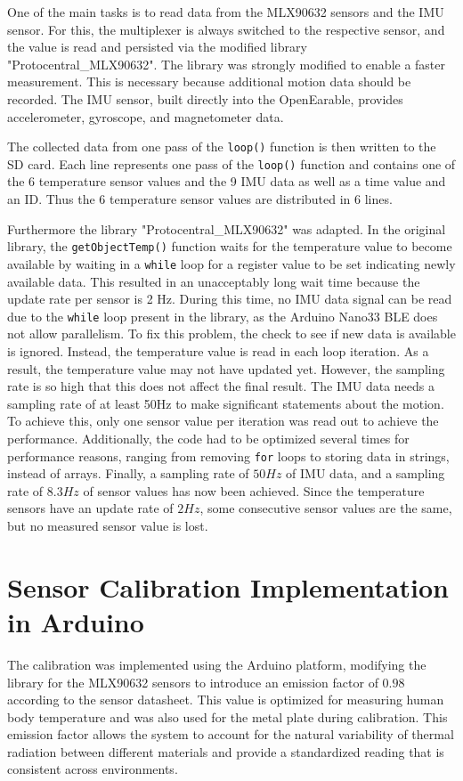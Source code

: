 One of the main tasks is to read data from the MLX90632 sensors and the IMU sensor. 
For this, the multiplexer is always switched to the respective sensor, and the value is read and persisted via the modified library "Protocentral\_MLX90632".
The library was strongly modified to enable a faster measurement. 
This is necessary because additional motion data should be recorded.
The IMU sensor, built directly into the OpenEarable, provides accelerometer, gyroscope, and magnetometer data.

The collected data from one pass of the \texttt{loop()} function is then written to the SD card. Each line represents one pass of the \texttt{loop()} function and contains one of the 6 temperature sensor values and the 9 IMU data as well as a time value and an ID.
Thus the 6 temperature sensor values are distributed in 6 lines. 

Furthermore the library "Protocentral\_MLX90632" was adapted. In the original library, the \texttt{getObjectTemp()} function waits for the temperature value to become available by waiting in a \texttt{while} loop for a register value to be set indicating newly available data. This resulted in an unacceptably long wait time because the update rate per sensor is 2 Hz. 
During this time, no IMU data signal can be read due to the \texttt{while} loop present in the library, as the Arduino Nano33 BLE does not allow parallelism. 
To fix this problem, the check to see if new data is available is ignored. 
Instead, the temperature value is read in each loop iteration. 
As a result, the temperature value may not have updated yet. 
However, the sampling rate is so high that this does not affect the final result.
The IMU data needs a sampling rate of at least 50Hz to make significant statements about the motion. 
To achieve this, only one sensor value per iteration was read out to achieve the performance. 
Additionally, the code had to be optimized several times for performance reasons, ranging from removing \texttt{for} loops to storing data in strings, instead of arrays. 
Finally, a sampling rate of $50Hz$ of IMU data, and a sampling rate of $8.3Hz$ of sensor values has now been achieved.
Since the temperature sensors have an update rate of $2Hz$, some consecutive sensor values are the same, but no measured sensor value is lost.

\section{Sensor Calibration Implementation in Arduino}
The calibration was implemented using the Arduino platform, modifying the library for the MLX90632 sensors to introduce an emission factor of $0.98$ according to the sensor datasheet. 
This value is optimized for measuring human body temperature and was also used for the metal plate during calibration. 
This emission factor allows the system to account for the natural variability of thermal radiation between different materials and provide a standardized reading that is consistent across environments.


